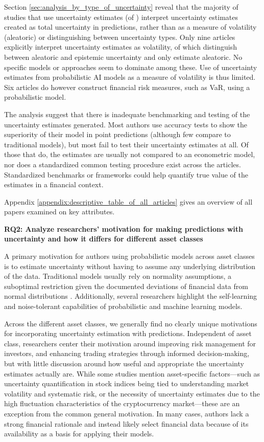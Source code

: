 Section \ref{sec:analysis_by_type_of_uncertainty} reveal that the majority of studies that use uncertainty estimates (\uqnondisting of \uqanyinterpretation) interpret uncertainty estimates created as total uncertainty in predictions, rather than as a measure of volatility (aleatoric) or distinguishing between uncertainty types. Only nine articles explicitly interpret uncertainty estimates as volatility, \uqdisting of which distinguish between aleatoric and epistemic uncertainty and \uqaleatoric only estimate aleatoric. No specific models or approaches seem to dominate among these. Use of uncertainty estimates from probabilistic AI models as a measure of volatility is thus limited. Six articles do however construct financial risk measures, such as VaR, using a probabilistic model.  

The analysis suggest that there is inadequate benchmarking and testing of the uncertainty estimates generated. Most authors use accuracy tests to show the superiority of their model in point predictions (although few compare to traditional models), but most fail to test their uncertainty estimates at all. Of those that do, the estimates are usually not compared to an econometric model, nor does a standardized common testing procedure exist across the articles. Standardized benchmarks or frameworks could help quantify true value of the estimates in a financial context.

Appendix \ref{appendix:descriptive_table_of_all_articles} gives an overview of all papers examined on key attributes. 

\textbf{RQ2: Analyze researchers' motivation for making predictions with uncertainty and how it differs for different asset classes}\nopagebreak

A primary motivation for authors using probabilistic models across asset classes is to estimate uncertainty without having to assume any underlying distribution of the data. Traditional models usually rely on normality assumptions, a suboptimal restriction given the documented deviations of financial data from normal distributions \parencite{Peir1994TheDO}. Additionally, several researchers highlight the self-learning and noise-tolerant capabilities of probabilistic and machine learning models.

Across the different asset classes, we generally find no clearly unique motivations for incorporating uncertainty estimation with predictions. Independent of asset class, researchers center their motivation around improving risk management for investors, and enhancing trading strategies through informed decision-making, but with little discussion around how useful and appropriate the uncertainty estimates actually are. While some studies mention asset-specific factors—such as uncertainty quantification in stock indices being tied to understanding market volatility and systematic risk, or the necessity of uncertainty estimates due to the high fluctuation characteristics of the cryptocurrency market—these are an exception from the common general motivation. In many cases, authors lack a strong financial rationale and instead likely select financial data because of its availability as a basis for applying their models. 

